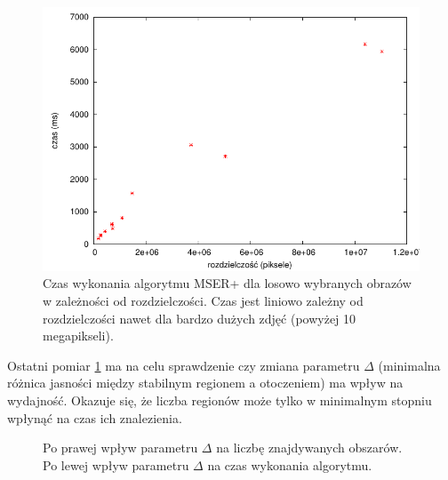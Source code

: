 \begin{figure}[h!] \centering \includegraphics{images/random.pdf}
\caption{Czas wykonania algorytmu MSER+ dla losowo wybranych obrazów w
zależności od rozdzielczości. Czas jest liniowo zależny od rozdzielczości nawet
dla bardzo dużych zdjęć (powyżej 10 megapikseli).} \end{figure}

Ostatni pomiar \ref{delta} ma na celu sprawdzenie czy zmiana parametru $\Delta$
(minimalna różnica jasności między stabilnym regionem a otoczeniem) ma wpływ na
wydajność. Okazuje się, że liczba regionów może tylko w minimalnym stopniu
wpłynąć na czas ich znalezienia.

\begin{figure} \centering
  \caption{Po prawej wpływ parametru $\Delta$ na liczbę znajdywanych obszarów.
  Po lewej wpływ parametru $\Delta$ na czas wykonania algorytmu.} \label{delta}
\end{figure}

